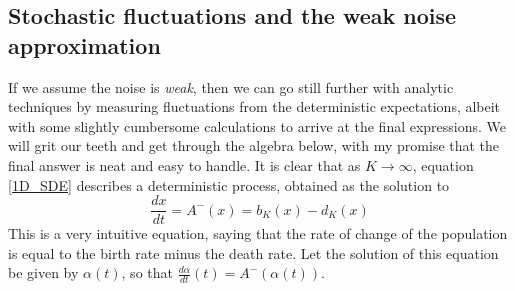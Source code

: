 \subsection{Stochastic fluctuations and the weak noise approximation}\label{sec_1D_WNA}
If we assume the noise is \emph{weak}, then we can go still further with analytic techniques by measuring fluctuations from the deterministic expectations, albeit with some slightly cumbersome calculations to arrive at the final expressions. We will grit our teeth and get through the algebra below, with my promise that the final answer is neat and easy to handle. It is clear that as $K \to \infty$, equation \eqref{1D_SDE} describes a deterministic process, obtained as the solution to
\begin{equation}
\label{1D_det_limit}
\frac{dx}{dt} = A^{-}(x) = b_{K}(x) - d_{K}(x)
\end{equation}
This is a very intuitive equation, saying that the rate of change of the population is equal to the birth rate minus the death rate. Let the solution of this equation  be given by $\alpha(t)$, so that $\frac{d{\alpha}}{dt}(t) = A^{-}(\alpha(t))$.

